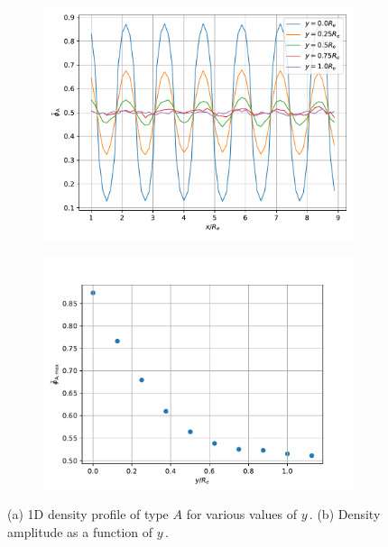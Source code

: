 \documentclass[bachelor,       %
               oneside,        %
               BCOR10mm,       %
               ngerman, english %
               ]{GAUBM}
\begin{document}
\begin{figure}[h]
  \centering
  \begin{subfigure}[b]{0.45\textwidth}
      \centering
      \includegraphics[width=\textwidth]{figures/amplitude_decay_profile.pdf}
      \caption{}
      \label{fig:amplitude_decay_profile}
  \end{subfigure}
    \hfill
  \begin{subfigure}[b]{0.45\textwidth}
      \centering
      \includegraphics[width=\textwidth]{figures/ampltitude_decay.pdf}
      \caption{}
      \label{fig:amplitude_decay}
  \end{subfigure}
     \caption{(a) 1D density profile of type $A$ for various values of $y\,.$ (b) Density amplitude as a function of $y\,.$}
     \label{fig:conversion_range_bulk}
\end{figure}
\end{document}
